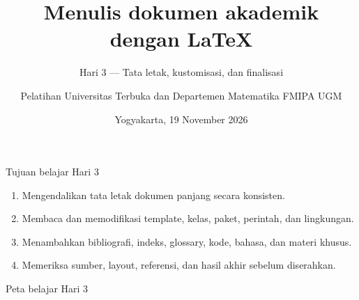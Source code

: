 \documentclass[aspectratio=169,11pt]{beamer}
\title{Menulis dokumen akademik dengan \LaTeX}
\subtitle{Hari 3 --- Tata letak, kustomisasi, dan finalisasi}
\author{Pelatihan Universitas Terbuka dan Departemen Matematika FMIPA UGM}
\date{Yogyakarta, 19 November 2026}
\begin{document}
\begin{frame}[plain]\inserttitle\par{}\insertsubtitle\par\medskip{}\par\medskip{}\insertauthor\par\smallskip{}\insertdate\end{frame}
\begin{frame}{Tujuan belajar Hari 3}
\begin{enumerate}
\item Mengendalikan tata letak dokumen panjang secara konsisten.
\item Membaca dan memodifikasi template, kelas, paket, perintah, dan lingkungan.
\item Menambahkan bibliografi, indeks, glossary, kode, bahasa, dan materi khusus.
\item Memeriksa sumber, layout, referensi, dan hasil akhir sebelum diserahkan.
\end{enumerate}
\end{frame}
\begin{frame}{Peta belajar Hari 3}
\tableofcontents
\end{frame}
\end{document}
